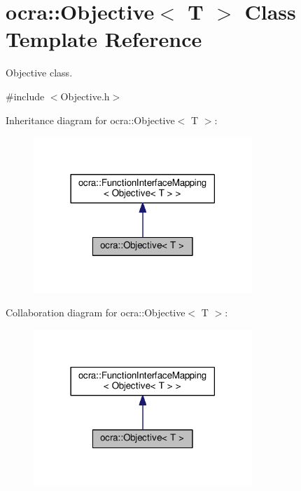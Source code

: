 \hypertarget{classocra_1_1Objective}{}\section{ocra\+:\+:Objective$<$ T $>$ Class Template Reference}
\label{classocra_1_1Objective}


Objective class.  




{\ttfamily \#include $<$Objective.\+h$>$}



Inheritance diagram for ocra\+:\+:Objective$<$ T $>$\+:
\nopagebreak
\begin{figure}[H]
\begin{center}
\leavevmode
\includegraphics[width=234pt]{d3/dcc/classocra_1_1Objective__inherit__graph}
\end{center}
\end{figure}


Collaboration diagram for ocra\+:\+:Objective$<$ T $>$\+:
\nopagebreak
\begin{figure}[H]
\begin{center}
\leavevmode
\includegraphics[width=234pt]{d7/d80/classocra_1_1Objective__coll__graph}
\end{center}
\end{figure}
